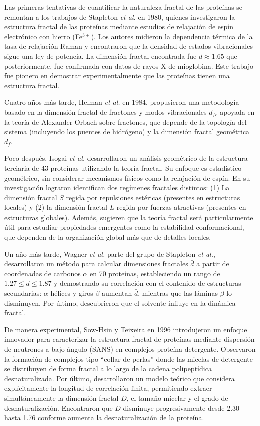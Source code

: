 Las primeras tentativas de cuantificar la naturaleza fractal de las proteínas se remontan a los trabajos de Stapleton \textit{et al.}\cite{Stapleton1980} en 1980, quienes investigaron la estructura fractal de las proteínas mediante estudios de relajación de espín electrónico con hierro (Fe$^{3+}$). Los autores midieron la dependencia térmica de la tasa de relajación Raman y encontraron que la densidad de estados vibracionales sigue una ley de potencia. La dimensión fractal encontrada fue $d \approx 1.65$ que posteriormente, fue confirmada con datos de rayos X de mioglobina. Este trabajo fue pionero en demostrar experimentalmente que las proteínas tienen una estructura fractal. 

Cuatro años más tarde, Helman \textit{et al.}\cite{Helman1984} en 1984, propusieron una metodología basado en la dimensión fractal de fractones y modos vibracionales $d_{fr}$ apoyada en la teoría de Alexander-Orbach \cite{Alexander1982} sobre fractones, que depende de la topología del sistema (incluyendo los puentes de hidrógeno) y la dimensión fractal geométrica $d_f$.

Poco después, Isogai \textit{et al.} \cite{Isogai1984} desarrollaron un análisis geométrico de la estructura terciaria de 43 proteínas utilizando la teoría fractal. Su enfoque es estadístico-geométrico, sin considerar mecanismos físicos como la relajación de espín.
En su investigación lograron identifican dos regímenes fractales distintos: (1) La dimensión fractal $S$ regida por repulsiones estéricas (presentes en estructuras locales) y (2) la dimensión fractal $L$ regida por fuerzas atractivas (presentes en estructuras globales). Además, sugieren que la teoría fractal será particularmente útil para estudiar propiedades emergentes como la estabilidad conformacional, que dependen de la organización global más que de detalles locales.

Un año más tarde, Wagner \textit{et al.} \cite{Wagner1985} parte  del grupo de Stapleton \textit{et al.}, desarrollaron un método para calcular dimensiones fractales $\bar{d}$ a partir de coordenadas de carbonos $\alpha$ en 70 proteínas, estableciendo un rango de $1.27 \leq \bar{d} \leq 1.87$ y demostrando su correlación con el contenido de estructuras secundarias: $\alpha$-hélices y giros-$\beta$ aumentan $\bar{d}$, mientras que las láminas-$\beta$ lo disminuyen. Por último, descubrieron que el solvente influye en la dinámica fractal.

De manera experimental, Sow-Hsin y Teixeira \cite{Chen1986} en 1996 introdujeron un enfoque innovador para caracterizar la estructura fractal de proteínas mediante dispersión de neutrones a bajo ángulo (SANS) en complejos proteína-detergente. Observaron la formación de complejos tipo ``collar de perlas'' donde las micelas de detergente se distribuyen de forma fractal a lo largo de la cadena polipeptídica desnaturalizada. Por último, desarrollaron un modelo teórico que considera explícitamente la longitud de correlación finita, permitiendo extraer simultáneamente la dimensión fractal $D$, el tamaño micelar y el grado de desnaturalización. Encontraron que $D$ disminuye progresivamente desde 2.30 hasta 1.76 conforme aumenta la desnaturalización de la proteína.

